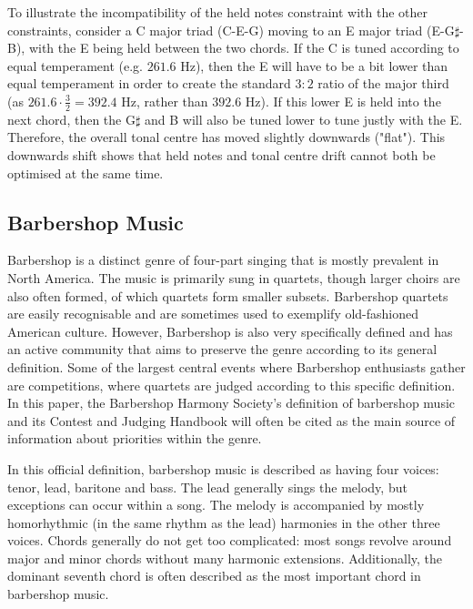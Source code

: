 \documentclass[a4paper]{article}
\begin{document}
To illustrate the incompatibility of the held notes constraint with the other constraints, consider a C major triad (C-E-G) moving to an E major triad (E-G$\sharp$-B), with the E being held between the two chords. If the C is tuned according to equal temperament (e.g. $261.6$ Hz), then the E will have to be a bit lower than equal temperament in order to create the standard $3:2$ ratio of the major third (as $261.6 \cdot \frac32 = 392.4$ Hz, rather than $392.6$ Hz). If this lower E is held into the next chord, then the G$\sharp$ and B will also be tuned lower to tune justly with the E. Therefore, the overall tonal centre has moved slightly downwards ("flat"). This downwards shift shows that held notes and tonal centre drift cannot both be optimised at the same time.

\subsection{Barbershop Music}
\label{intro_bs}
Barbershop is a distinct genre of four-part singing that is mostly prevalent in North America. The music is primarily sung in quartets, though larger choirs are also often formed, of which quartets form smaller subsets.\cite{garnett_ethics_1999} Barbershop quartets are easily recognisable and are sometimes used to exemplify old-fashioned American culture. However, Barbershop is also very specifically defined and has an active community that aims to preserve the genre according to its general definition. Some of the largest central events where Barbershop enthusiasts gather are competitions, where quartets are judged according to this specific definition.\cite{barbershop_harmony_society_contest_2022} In this paper, the Barbershop Harmony Society's definition of barbershop music and its Contest and Judging Handbook will often be cited as the main source of information about priorities within the genre.

In this official definition, barbershop music is described as having four voices: tenor, lead, baritone and bass. The lead generally sings the melody, but exceptions can occur within a song. The melody is accompanied by mostly homorhythmic (in the same rhythm as the lead) harmonies in the other three voices. Chords generally do not get too complicated: most songs revolve around major and minor chords without many harmonic extensions. Additionally, the dominant seventh chord is often described as the most important chord in barbershop music.
\end{document}

